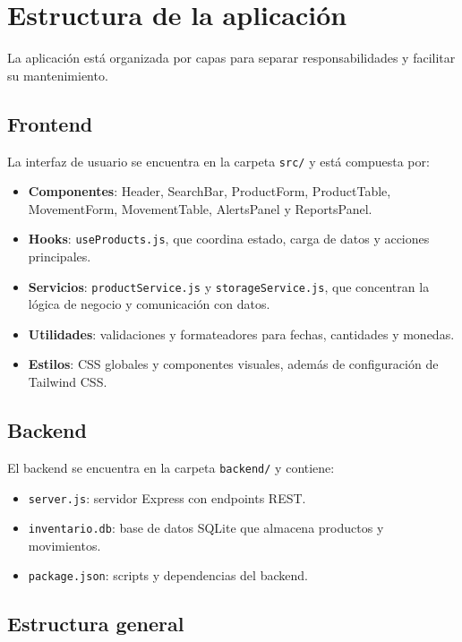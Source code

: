 \documentclass[12pt,a4paper]{article}
\begin{document}
\section{Estructura de la aplicación}

La aplicación está organizada por capas para separar responsabilidades y facilitar su mantenimiento.

\subsection{Frontend}

La interfaz de usuario se encuentra en la carpeta \texttt{src/} y está compuesta por:

\begin{itemize}[leftmargin=1.2cm]
    \item \textbf{Componentes}: Header, SearchBar, ProductForm, ProductTable, MovementForm, MovementTable, AlertsPanel y ReportsPanel.
    \item \textbf{Hooks}: \texttt{useProducts.js}, que coordina estado, carga de datos y acciones principales.
    \item \textbf{Servicios}: \texttt{productService.js} y \texttt{storageService.js}, que concentran la lógica de negocio y comunicación con datos.
    \item \textbf{Utilidades}: validaciones y formateadores para fechas, cantidades y monedas.
    \item \textbf{Estilos}: CSS globales y componentes visuales, además de configuración de Tailwind CSS.
\end{itemize}

\subsection{Backend}

El backend se encuentra en la carpeta \texttt{backend/} y contiene:

\begin{itemize}[leftmargin=1.2cm]
    \item \texttt{server.js}: servidor Express con endpoints REST.
    \item \texttt{inventario.db}: base de datos SQLite que almacena productos y movimientos.
    \item \texttt{package.json}: scripts y dependencias del backend.
\end{itemize}

\newpage 

\subsection{Estructura general}
\end{document}
